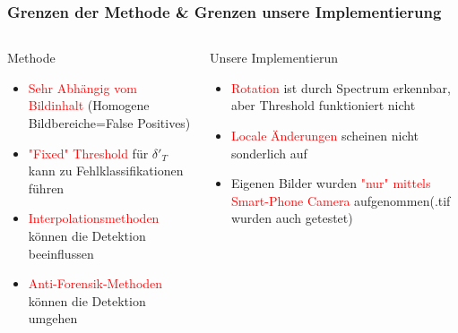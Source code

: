 \documentclass[11pt,t,usepdftitle=false,aspectratio=169]{beamer}
\begin{document}
\begin{frame}
	\frametitle{Grenzen der Methode \& Grenzen unsere Implementierung}
	
	\begin{columns}[T]
		\begin{column}{0.48\textwidth}
			\begin{alertblock}{Methode}
				\begin{itemize}
					\item \textcolor{red}{Sehr Abhängig vom Bildinhalt} (Homogene Bildbereiche=False Positives)
					\item \textcolor{red}{"Fixed" Threshold} für $\delta'_T$ kann zu Fehlklassifikationen führen
					\item \textcolor{red}{Interpolationsmethoden} können die Detektion beeinflussen
					\item \textcolor{red}{Anti-Forensik-Methoden} können die Detektion umgehen~\cite{kirchner_hiding_2008}
				\end{itemize}
			\end{alertblock}
		\end{column}
		\begin{column}{0.48\textwidth}
			\begin{exampleblock}{Unsere Implementierun}
				\begin{itemize}
					\item \textcolor{red}{Rotation} ist durch Spectrum erkennbar, aber Threshold funktioniert nicht
					\item \textcolor{red}{Locale Änderungen} scheinen nicht sonderlich auf
					\item Eigenen Bilder wurden \textcolor{red}{"nur" mittels Smart-Phone Camera} aufgenommen(.tif wurden auch getestet)
				\end{itemize}
			\end{exampleblock}
		\end{column}
	\end{columns}
\end{frame}
\end{document}

